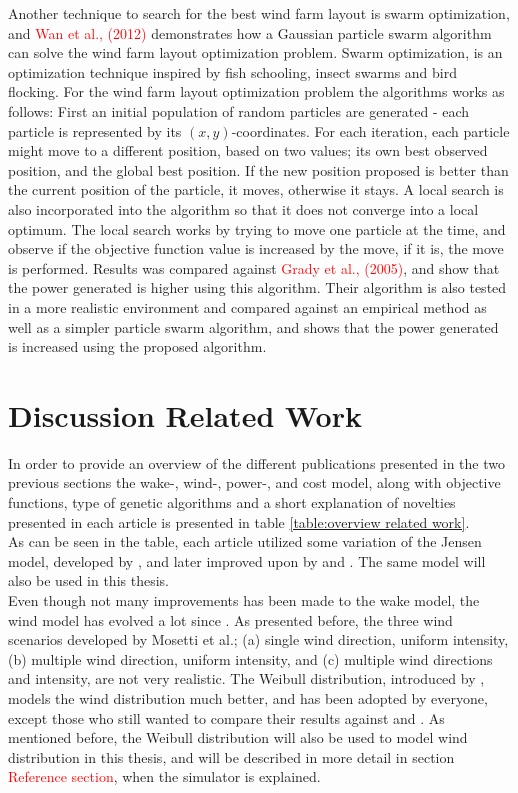 \noindent Another technique to search for the best wind farm layout is swarm optimization, and \textcolor{red}{Wan et al., (2012)} demonstrates how a Gaussian particle swarm algorithm can solve the wind farm layout optimization problem. Swarm optimization, is an optimization technique inspired by fish schooling, insect swarms and bird flocking. For the wind farm layout optimization problem the algorithms works as follows: First an initial population of random particles are generated - each particle is represented by its $(x, y)$-coordinates. For each iteration, each particle might move to a different position, based on two values; its own best observed position, and the global best position. If the new position proposed is better than the current position of the particle, it moves, otherwise it stays. A local search is also incorporated into the algorithm so that it does not converge into a local optimum. The local search works by trying to move one particle at the time, and observe if the objective function value is increased by the move, if it is, the move is performed. Results was compared against \textcolor{red}{Grady et al., (2005)}, and show that the power generated is higher using this algorithm. Their algorithm is also tested in a more realistic environment and compared against an empirical method as well as a simpler particle swarm algorithm, and shows that the power generated is increased using the proposed algorithm. \\


\section{Discussion Related Work}
In order to provide an overview of the different publications presented in the two previous sections the wake-, wind-, power-, and cost model, along with objective functions, type of genetic algorithms and a short explanation of novelties presented in each article is presented in table \ref{table:overview related work}. \\

\noindent As can be seen in the table, each article utilized some variation of the Jensen model, developed by \citep{Jensen}, and later improved upon by \citep{Katic} and \citep{Frandsen}. The same model will also be used in this thesis. \\

\noindent Even though not many improvements has been made to the wake model, the wind model has evolved a lot since \citep{Mosetti}. As presented before, the three wind scenarios developed by Mosetti et al.; (a) single wind direction, uniform intensity, (b) multiple wind direction, uniform intensity, and (c) multiple wind directions and intensity, are not very realistic. The Weibull distribution, introduced by \citep{Mora}, models the wind distribution much better, and has been adopted by everyone, except those who still wanted to compare their results against \citep{Mosetti} and \citep{Grady}. As mentioned before, the Weibull distribution will also be used to model wind distribution in this thesis, and will be described in more detail in section \textcolor{red}{Reference section}, when the simulator is explained. \\

